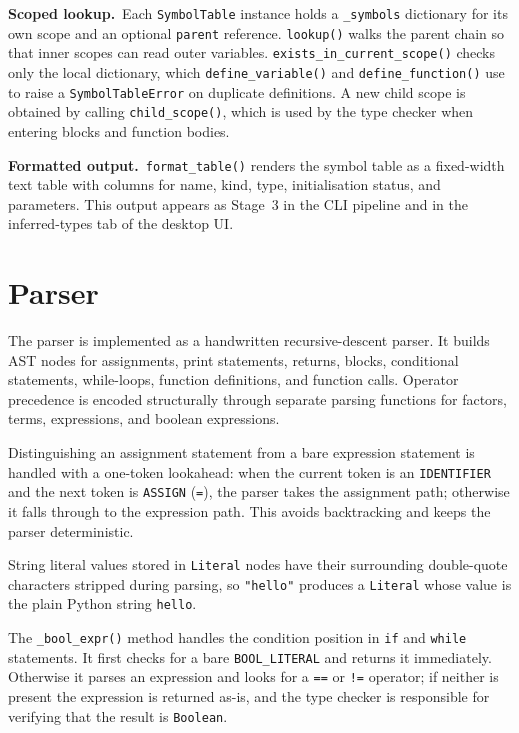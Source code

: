 \textbf{Scoped lookup.}\ Each \texttt{SymbolTable} instance holds a
\texttt{\_symbols} dictionary for its own scope and an optional \texttt{parent}
reference. \texttt{lookup()} walks the parent chain so that inner scopes can
read outer variables. \texttt{exists\_in\_current\_scope()} checks only the
local dictionary, which \texttt{define\_variable()} and
\texttt{define\_function()} use to raise a \texttt{SymbolTableError} on
duplicate definitions. A new child scope is obtained by calling
\texttt{child\_scope()}, which is used by the type checker when entering blocks
and function bodies.

\textbf{Formatted output.}\ \texttt{format\_table()} renders the symbol table
as a fixed-width text table with columns for name, kind, type, initialisation
status, and parameters. This output appears as Stage~3 in the CLI pipeline and
in the inferred-types tab of the desktop UI.

\section{Parser}
The parser is implemented as a handwritten recursive-descent parser. It builds
AST nodes for assignments, print statements, returns, blocks, conditional
statements, while-loops, function definitions, and function calls. Operator
precedence is encoded structurally through separate parsing functions for
factors, terms, expressions, and boolean expressions.

Distinguishing an assignment statement from a bare expression statement is
handled with a one-token lookahead: when the current token is an
\texttt{IDENTIFIER} and the next token is \texttt{ASSIGN} (\texttt{=}), the
parser takes the assignment path; otherwise it falls through to the expression
path. This avoids backtracking and keeps the parser deterministic.

String literal values stored in \texttt{Literal} nodes have their surrounding
double-quote characters stripped during parsing, so \texttt{"hello"} produces a
\texttt{Literal} whose value is the plain Python string \texttt{hello}.

The \texttt{\_bool\_expr()} method handles the condition position in
\texttt{if} and \texttt{while} statements. It first checks for a bare
\texttt{BOOL\_LITERAL} and returns it immediately. Otherwise it parses an
expression and looks for a \texttt{==} or \texttt{!=} operator; if neither
is present the expression is returned as-is, and the type checker is responsible
for verifying that the result is \texttt{Boolean}.

